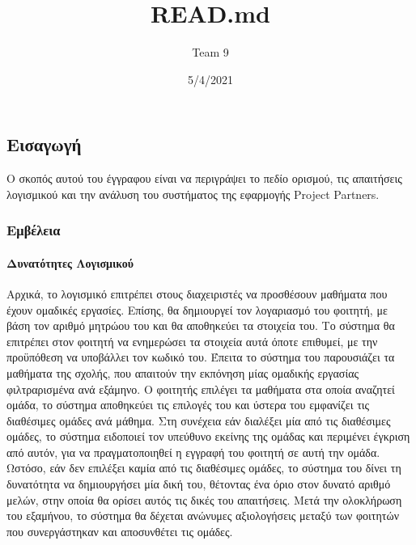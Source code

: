 \documentclass[
]{article}
\title{READ.md}
\author{Team 9}
\date{5/4/2021}
\begin{document}
\maketitle

\hypertarget{ux3b5ux3b9ux3c3ux3b1ux3b3ux3c9ux3b3ux3ae}{%
\subsection{Εισαγωγή}\label{ux3b5ux3b9ux3c3ux3b1ux3b3ux3c9ux3b3ux3ae}}

Ο σκοπός αυτού του έγγραφου είναι να περιγράψει το πεδίο ορισμού, τις
απαιτήσεις λογισμικού και την ανάλυση του συστήματος της εφαρμογής
Project Partners.

\hypertarget{ux3b5ux3bcux3b2ux3adux3bbux3b5ux3b9ux3b1}{%
\subsubsection{Εμβέλεια}\label{ux3b5ux3bcux3b2ux3adux3bbux3b5ux3b9ux3b1}}

\hypertarget{ux3b4ux3c5ux3bdux3b1ux3c4ux3ccux3c4ux3b7ux3c4ux3b5ux3c2-ux3bbux3bfux3b3ux3b9ux3c3ux3bcux3b9ux3baux3bfux3cd}{%
\paragraph{Δυνατότητες
Λογισμικού}\label{ux3b4ux3c5ux3bdux3b1ux3c4ux3ccux3c4ux3b7ux3c4ux3b5ux3c2-ux3bbux3bfux3b3ux3b9ux3c3ux3bcux3b9ux3baux3bfux3cd}}

Αρχικά, το λογισμικό επιτρέπει στους διαχειριστές να προσθέσουν μαθήματα
που έχουν ομαδικές εργασίες. Επίσης, θα δημιουργεί τον λογαριασμό του
φοιτητή, με βάση τον αριθμό μητρώου του και θα αποθηκεύει τα στοιχεία
του. Το σύστημα θα επιτρέπει στον φοιτητή να ενημερώσει τα στοιχεία αυτά
όποτε επιθυμεί, με την προϋπόθεση να υποβάλλει τον κωδικό του. Έπειτα το
σύστημα του παρουσιάζει τα μαθήματα της σχολής, που απαιτούν την
εκπόνηση μίας ομαδικής εργασίας φιλτραρισμένα ανά εξάμηνο. Ο φοιτητής
επιλέγει τα μαθήματα στα οποία αναζητεί ομάδα, το σύστημα αποθηκεύει τις
επιλογές του και ύστερα του εμφανίζει τις διαθέσιμες ομάδες ανά μάθημα.
Στη συνέχεια εάν διαλέξει μία από τις διαθέσιμες ομάδες, το σύστημα
ειδοποιεί τον υπεύθυνο εκείνης της ομάδας και περιμένει έγκριση από
αυτόν, για να πραγματοποιηθεί η εγγραφή του φοιτητή σε αυτή την ομάδα.
Ωστόσο, εάν δεν επιλέξει καμία από τις διαθέσιμες ομάδες, το σύστημα του
δίνει τη δυνατότητα να δημιουργήσει μία δική του, θέτοντας ένα όριο στον
δυνατό αριθμό μελών, στην οποία θα ορίσει αυτός τις δικές του
απαιτήσεις. Μετά την ολοκλήρωση του εξαμήνου, το σύστημα θα δέχεται
ανώνυμες αξιολογήσεις μεταξύ των φοιτητών που συνεργάστηκαν και
αποσυνθέτει τις ομάδες.
\end{document}
